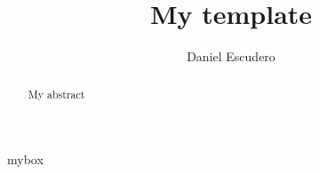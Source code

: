 \documentclass[
draft=false,
fontsize=10pt,
titlepage=false,
abstract=true, %
parskip=half, %
footnotes=multiple, %
%
DIV=10, %
twoside=false,
twocolumn=false,
headinclude=false,
footinclude=false, %
headsepline=fale,
footsepline=false, %
%
headings=standardclasses, %
headings=big
]{scrartcl} %
\title{My template}
\author{Daniel Escudero}
\date{}
\begin{document}
 
\maketitle 

\begin{abstract}
  My abstract
\end{abstract}

\begin{mybox}{mybox}
  \blindtext
\end{mybox}
\Blinddocument
\end{document}
